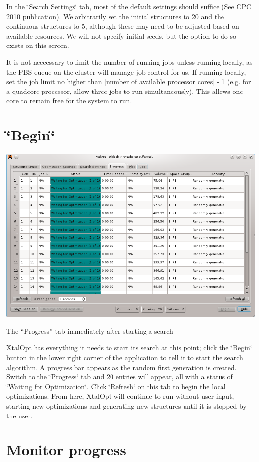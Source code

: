 In the \char`\"{}\-Search Settings\char`\"{} tab, most of the default settings should suffice (See C\-P\-C 2010 publication). We arbitrarily set the initial structures to 20 and the continuous structures to 5, although these may need to be adjusted based on available resources. We will not specify initial seeds, but the option to do so exists on this screen.

It is not neccessary to limit the number of running jobs unless running locally, as the P\-B\-S queue on the cluster will manage job control for us. If running locally, set the job limit no higher than \mbox{[}number of available processor cores\mbox{]} -\/ 1 (e.\-g. for a quadcore processor, allow three jobs to run simultaneously). This allows one core to remain free for the system to run.\hypertarget{tut-xo_begin}{}\section{\char`\"{}\-Begin\char`\"{}}\label{tut-xo_begin}

\begin{DoxyImage}
\includegraphics[width=\textwidth]{prog-start.png}
\caption{The ``\-Progress'' tab immediately after starting a search}
\end{DoxyImage}


Xtal\-Opt has everything it needs to start its search at this point; click the \char`\"{}\-Begin\char`\"{} button in the lower right corner of the application to tell it to start the search algorithm. A progress bar appears as the random first generation is created. Switch to the \char`\"{}\-Progress\char`\"{} tab and 20 entries will appear, all with a status of \char`\"{}\-Waiting for
\-Optimization\char`\"{}. Click \char`\"{}\-Refresh\char`\"{} on this tab to begin the local optimizations. From here, Xtal\-Opt will continue to run without user input, starting new optimizations and generating new structures until it is stopped by the user.\hypertarget{tut-xo_prog-mon}{}\section{Monitor progress}\label{tut-xo_prog-mon}


